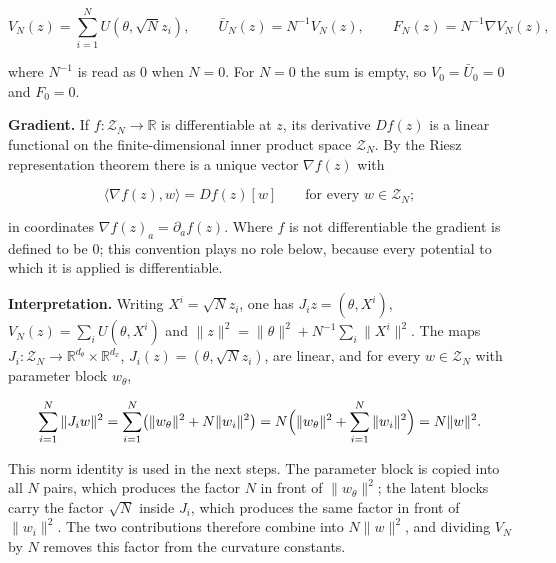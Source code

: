 \documentclass[11pt,a4paper]{article}
\begin{document}
\[V_N(z)=\sum_{i=1}^NU(\theta,\sqrt Nz_i),\qquad\bar U_N(z)=N^{-1}V_N(z),\qquad F_N(z)=N^{-1}\nabla V_N(z),\]


where \(N^{-1}\) is read as \(0\) when \(N=0\). For \(N=0\) the sum is empty, so \(V_0=\bar U_0=0\) and \(F_0=0\).




\textbf{Gradient.} If \(f:\mathcal Z_N\to\mathbb R\) is differentiable at \(z\), its derivative \(Df(z)\) is a linear functional on the finite-dimensional inner product space \(\mathcal Z_N\). By the Riesz representation theorem there is a unique vector \(\nabla f(z)\) with


\[\langle\nabla f(z),w\rangle=Df(z)[w]\qquad\text{for every }w\in\mathcal Z_N;\]


in coordinates \(\nabla f(z)_a=\partial_af(z)\). Where \(f\) is not differentiable the gradient is defined to be \(0\); this convention plays no role below, because every potential to which it is applied is differentiable.




\textbf{Interpretation.} Writing \(X^i=\sqrt Nz_i\), one has \(J_iz=(\theta,X^i)\), \(V_N(z)=\sum_iU(\theta,X^i)\) and \(\|z\|^2=\|\theta\|^2+N^{-1}\sum_i\|X^i\|^2\). The maps \(J_i:\mathcal Z_N\to\mathbb R^{d_\theta}\times\mathbb R^{d_x}\), \(J_i(z)=(\theta,\sqrt Nz_i)\), are linear, and for every \(w\in\mathcal Z_N\) with parameter block \(w_\theta\),


\[\sum_{i=1}^N\|J_iw\|^2=\sum_{i=1}^N\bigl(\|w_\theta\|^2+N\|w_i\|^2\bigr)=N\Bigl(\|w_\theta\|^2+\sum_{i=1}^N\|w_i\|^2\Bigr)=N\|w\|^2.\]


This norm identity is used in the next steps. The parameter block is copied into all \(N\) pairs, which produces the factor \(N\) in front of \(\|w_\theta\|^2\); the latent blocks carry the factor \(\sqrt N\) inside \(J_i\), which produces the same factor in front of \(\|w_i\|^2\). The two contributions therefore combine into \(N\|w\|^2\), and dividing \(V_N\) by \(N\) removes this factor from the curvature constants.
\end{document}
